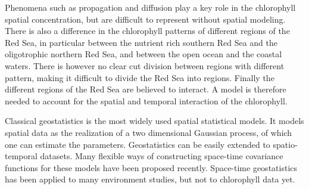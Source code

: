 Phenomena such as propagation and diffusion play a key role in the chlorophyll spatial concentration, but are difficult to represent without spatial modeling. There is also a difference in the chlorophyll patterns of different regions of the Red Sea, in particular between the nutrient rich southern Red Sea and the oligotrophic northern Red Sea, and between the open ocean and the coastal waters. There is however no clear cut division between regions with different pattern, making it difficult to divide the Red Sea into regions. Finally the different regions of the Red Sea are believed to interact. A model is therefore needed to account for the spatial and temporal interaction of the chlorophyll.

Classical geostatistics is the most widely used spatial statistical models. It models spatial data as the realization of a two dimensional Gaussian process, of which one can estimate the parameters. Geostatistics can be easily extended to spatio-temporal datasets. Many flexible ways of constructing space-time covariance functions for these models have been proposed recently. Space-time geostatistics has been applied to many environment studies, but not to chlorophyll data yet.

